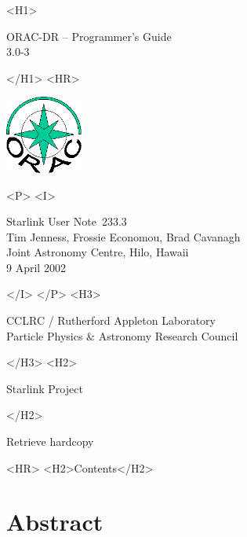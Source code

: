 \documentclass[twoside,11pt]{article}
\newcommand{\stardoccategory}  {Starlink User Note}
\newcommand{\stardocsource}    {sun\stardocnumber}
\newcommand{\stardocnumber}    {233.3}
\newcommand{\stardocauthors}   {Tim Jenness, Frossie Economou, Brad Cavanagh\\
Joint Astronomy Centre, Hilo, Hawaii}
\newcommand{\stardocdate}      {9 April 2002}
\newcommand{\stardoctitle}     {ORAC-DR -- Programmer's Guide}
\newcommand{\stardocversion}   {3.0-3}
\newcommand{\stardocmanual}    {}
\newcommand{\htmladdnormallink}[2]{#1}
\newcommand{\htmladdimg}[1]{}
\newcommand{\htmlref}[2]{#1}
\newcommand{\htmladdtonavigation}[1]{}
\newcommand{\xlabel}[1]{}
\renewcommand{\_}{\texttt{\symbol{95}}}
\begin{document}
\begin{htmlonly}
   \xlabel{}
   \begin{rawhtml} <H1> \end{rawhtml}
      \stardoctitle\\
      \stardocversion\\
      \stardocmanual
   \begin{rawhtml} </H1> <HR> \end{rawhtml}

\includegraphics[width=1.0in]{sun233_logo}

   \begin{rawhtml} <P> <I> \end{rawhtml}
   \stardoccategory\ \stardocnumber \\
   \stardocauthors \\
   \stardocdate
   \begin{rawhtml} </I> </P> <H3> \end{rawhtml}
      \htmladdnormallink{CCLRC / Rutherford Appleton Laboratory}
                        {http://www.cclrc.ac.uk} \\
      \htmladdnormallink{Particle Physics \& Astronomy Research Council}
                        {http://www.pparc.ac.uk} \\
   \begin{rawhtml} </H3> <H2> \end{rawhtml}
      \htmladdnormallink{Starlink Project}{http://www.starlink.rl.ac.uk/}
   \begin{rawhtml} </H2> \end{rawhtml}
   \htmladdnormallink{\htmladdimg{source.gif} Retrieve hardcopy}
      {http://www.starlink.rl.ac.uk/cgi-bin/hcserver?\stardocsource}\\

  \label{stardoccontents}
  \begin{rawhtml} 
    <HR>
    <H2>Contents</H2>
  \end{rawhtml}
  \htmladdtonavigation{\htmlref{\htmladdimg{contents_motif.gif}}
        {stardoccontents}}

  \section{\xlabel{abstract}Abstract}
\end{htmlonly}
\end{document}
